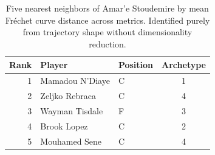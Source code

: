 \begin{table}[htbp]
  \centering\small
  \begin{tabular}{rllc}
    \toprule
    Rank & Player & Position & Archetype \\
    \midrule
    1 & Mamadou N'Diaye & C & 1 \\
    2 & Zeljko Rebraca & C & 4 \\
    3 & Wayman Tisdale & F & 3 \\
    4 & Brook Lopez & C & 2 \\
    5 & Mouhamed Sene & C & 4 \\
    \bottomrule
  \end{tabular}
  \caption{Five nearest neighbors of Amar'e Stoudemire by mean Fr\'{e}chet curve distance across metrics. Identified purely from trajectory shape without dimensionality reduction.}
  \label{tab:Amar_e_Stoudemire_frechet_curve_neighbors}
\end{table}

